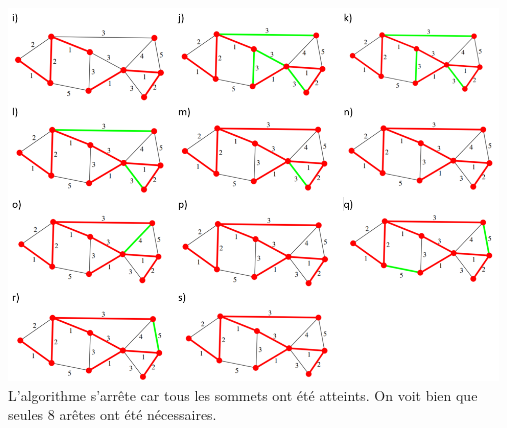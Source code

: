 \begin{Exercice}[5 minutes]
\begin{solution}
        \includegraphics[width=13cm]{solutions/K2.PNG}\\
        L'algorithme s'arrête car tous les sommets ont été atteints. On voit bien que seules 8 arêtes ont été nécessaires.
      
    \end{solution}

\end{Exercice}

